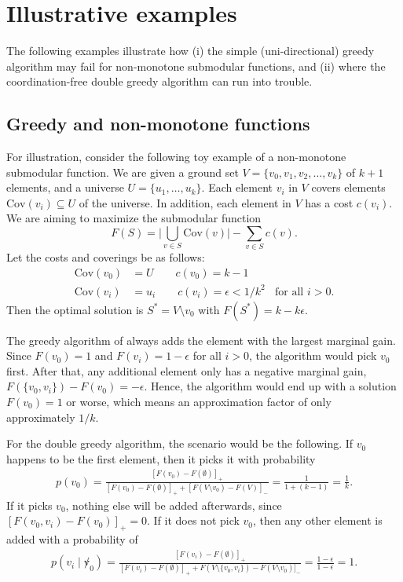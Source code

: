 \section{Illustrative examples}

The following examples illustrate how (i) the simple (uni-directional) greedy algorithm may fail for non-monotone submodular functions, and (ii) where the coordination-free double greedy algorithm can run into trouble.

\subsection{Greedy and non-monotone functions}\label{app:greedyfail}

For illustration, consider the following toy example of a non-monotone submodular function. We are given a ground set $V = \{v_0, v_1, v_2, \ldots, v_k\}$ of $k+1$ elements, and a universe $U = \{u_1, \ldots, u_k\}$. Each element $v_i$ in $V$ covers elements $\mathrm{Cov}(v_i) \subseteq U$ of the universe. In addition, each element in $V$ has a cost $c(v_i)$. We are aiming to maximize the submodular function
\begin{equation}
  \label{eq:1}
  F(S) = \Big|\bigcup_{v \in S}\mathrm{Cov}(v)\Big| - \sum_{v \in S}c(v).
\end{equation}
Let the costs and coverings be as follows:
\begin{align}
  \mathrm{Cov}(v_0) &= U \qquad c(v_0) = k-1\\
  \mathrm{Cov}(v_i) &= u_i  \qquad c(v_i) = \epsilon < 1/k^2\;\; \text{ for all } i > 0.
\end{align}
Then the optimal solution is $S^* = V\setminus v_0$ with $F(S^*) = k - k\epsilon$. 

The greedy algorithm of \citet{nemhauser1978} always adds the element with the largest marginal gain. Since $F(v_0) = 1$ and $F(v_i) = 1-\epsilon$ for all $i > 0$, the algorithm would pick $v_0$ first. After that, any additional element only has a negative marginal gain, $F(\{v_0,v_i\}) - F(v_0) = - \epsilon$. Hence, the algorithm would end up with a solution $F(v_0) = 1$ or worse, which means an approximation factor of only approximately $1/k$.

For the double greedy algorithm, the scenario would be the following.
If $v_0$ happens to be the first element, then it picks it with probability
\begin{align}
  p(v_0) =
  \frac{[F(v_0) - F(\emptyset)]_+}{[F(v_0) - F(\emptyset)]_+ +
    [F(V\setminus v_0) - F(V)]_-} = \frac{1}{1 + (k-1)} = \frac{1}{k}.
\end{align}
If it picks $v_0$, nothing else will be added afterwards, since $[F(v_0,v_i) - F(v_0)]_+ = 0$. If it does not pick $v_0$, then any other element is added with a probability of 
\begin{align}
  p(v_i \mid \not v_0) = \frac{[F(v_i) - F(\emptyset)]_+}{[F(v_i) - F(\emptyset)]_+ + F(V\setminus \{v_0,v_i\}) - F(V\setminus v_0)]_-} = \frac{1-\epsilon}{1-\epsilon} = 1.
\end{align}

